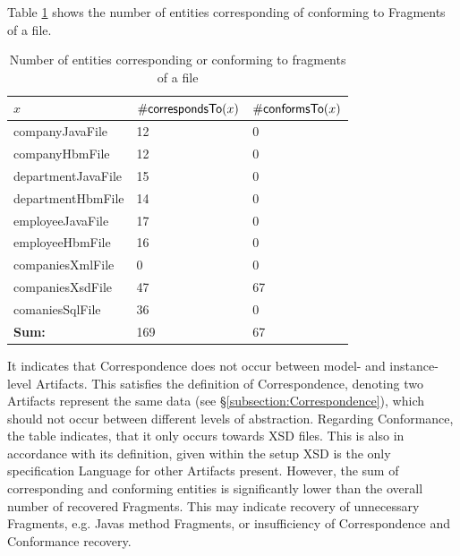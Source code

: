 Table \ref{table:NumberOfEntitiesCorrespondingOrConformingToFragmentsOfAFile} shows the number of entities corresponding of conforming to \glspl{Fragment} of a file.
\begin{table}[h!]
\begin{center}
\begin{tabular}{|l|l|l|}
\hline
$x$ & $\#\textsf{correspondsTo}(x)$ & $\#\textsf{conformsTo}(x)$
\\ \hline
companyJavaFile & 12 & 0 
\\ \hline
companyHbmFile & 12 & 0 
\\ \hline
departmentJavaFile & 15 & 0 
\\ \hline
departmentHbmFile & 14 & 0 
\\ \hline
employeeJavaFile & 17 & 0 
\\ \hline
employeeHbmFile & 16 & 0 
\\ \hline
companiesXmlFile & 0 & 0 
\\ \hline
companiesXsdFile & 47 & 67 
\\ \hline
comaniesSqlFile & 36 & 0 
\\ \hline \hline
\textbf{Sum:} & 169 & 67 
\\ \hline 
\end{tabular}
\end{center}
\caption{Number of entities corresponding or conforming to fragments of a file}
\label{table:NumberOfEntitiesCorrespondingOrConformingToFragmentsOfAFile}
\end{table}
It indicates that \gls{Correspondence} does not occur between model- and instance-level \glspl{Artifact}.
This satisfies the definition of \gls{Correspondence}, denoting two \glspl{Artifact} represent the same data (see §\ref{subsection:Correspondence}), which should not occur between different levels of abstraction.
Regarding \gls{Conformance}, the table indicates, that it only occurs towards \gls{XSD} files.
This is also in accordance with its definition, given within the setup \gls{XSD} is the only specification \gls{Language} for other \glspl{Artifact} present.
However, the sum of corresponding and conforming entities is significantly lower than the overall number of recovered \glspl{Fragment}.
This may indicate recovery of unnecessary \glspl{Fragment}, e.g. \glspl{Java} method \glspl{Fragment}, or insufficiency of \gls{Correspondence} and \gls{Conformance} recovery.
